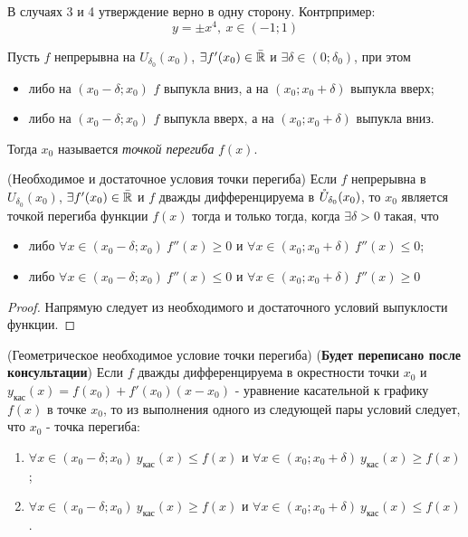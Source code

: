 \begin{note}
	В случаях 3 и 4 утверждение верно в одну сторону. Контрпример: 
	\[
		y = \pm x^4,\ x \in (-1; 1)
	\]
\end{note}

\begin{definition}
	Пусть $f$ непрерывна на $U_{\delta_0}(x_0)$, $\exists f'(x_0) \in \bar{\mathbb{R}}$ и $\exists \delta \in (0; \delta_0)$, при этом
	\begin{itemize}
		\item либо на $(x_0 - \delta; x_0)$ $f$ выпукла вниз, а на $(x_0; x_0 + \delta)$ выпукла вверх;
		
		\item либо на $(x_0 - \delta; x_0)$ $f$ выпукла вверх, а на $(x_0; x_0 + \delta)$ выпукла вниз.
	\end{itemize}
	Тогда $x_0$ называется \textit{точкой перегиба} $f(x)$.
\end{definition}

\begin{theorem} (Необходимое и достаточное условия точки перегиба)
	Если $f$ непрерывна в $U_{\delta_0}(x_0)$, $\exists f'(x_0) \in \bar{\mathbb{R}}$ и $f$ дважды дифференцируема в $\mathring{U}_{\delta_0}(x_0)$, то $x_0$ является точкой перегиба функции $f(x)$ тогда и только тогда, когда $\exists \delta > 0$ такая, что
	\begin{itemize}
		\item либо $\forall x \in (x_0 - \delta; x_0)\ f''(x) \ge 0$ и $\forall x \in (x_0; x_0 + \delta)\ f''(x) \le 0$;
		
		\item либо $\forall x \in (x_0 - \delta; x_0)\ f''(x) \le 0$ и $\forall x \in (x_0; x_0 + \delta)\ f''(x) \ge 0$
	\end{itemize}
\end{theorem}

\begin{proof}
	Напрямую следует из необходимого и достаточного условий выпуклости функции.
\end{proof}

\begin{theorem} (Геометрическое необходимое условие точки перегиба) (\textbf{Будет переписано после консультации})
	Если $f$ дважды дифференцируема в окрестности точки $x_0$ и $y_{\text{кас}}(x) = f(x_0) + f'(x_0) (x - x_0)$ - уравнение касательной к графику $f(x)$ в точке $x_0$, то из выполнения одного из следующей пары условий следует, что $x_0$ - точка перегиба:
	\begin{enumerate}
		\item $\forall x \in (x_0 - \delta; x_0)\ y_{\text{кас}}(x) \le f(x)$ и $\forall x \in (x_0; x_0 + \delta)\ y_{\text{кас}}(x) \ge f(x)$;
		
		\item $\forall x \in (x_0 - \delta; x_0)\ y_{\text{кас}}(x) \ge f(x)$ и $\forall x \in (x_0; x_0 + \delta)\ y_{\text{кас}}(x) \le f(x)$.
	\end{enumerate}
\end{theorem}

